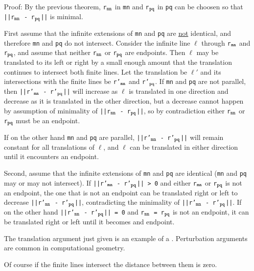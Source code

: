 \documentclass[12pt]{article}
\begin{document}
\begin{indpar}{0.3in}
Proof: By the previous theorem, {\tt r$_{\tt mn}$} in {\tt mn} and
{\tt r$_{\tt pq}$} in {\tt pq} can be choosen so that
{\tt ||r$_{\tt mn}$ - r$_{\tt pq}$||} is minimal.

First assume that the infinite extensions of {\tt mn} and {\tt pq} are
\underline{not} identical, and therefore {\tt mn} and {\tt pq} do not
intersect.  Consider the infinite line $\ell$ through
{\tt r$_{\tt mn}$} and {\tt r$_{\tt pq}$}, and assume that
neither
{\tt r$_{\tt mn}$} or {\tt r$_{\tt pq}$} are endpoints.
Then $\ell$ may be translated to its left or right by
a small enough amount that the translation continues
to intersect both finite lines.  Let the translation
be $\ell'$ and its intersections with the finite lines be
{\tt r'$_{\tt mn}$} and {\tt r'$_{\tt pq}$}.
If {\tt mn} and {\tt pq} are not parallel, then
{\tt ||r'$_{\tt mn}$ - r'$_{\tt pq}$||} will increase
as $\ell$ is translated in one direction and decrease as
it is translated in the other direction, but a decrease
cannot happen by assumption of minimality of
{\tt ||r$_{\tt mn}$ - r$_{\tt pq}$||}, so by contradiction either
{\tt r$_{\tt mn}$} or {\tt r$_{\tt pq}$} must be an endpoint.

If on the other hand {\tt mn} and {\tt pq} are parallel,
{\tt ||r'$_{\tt mn}$ - r'$_{\tt pq}$||} will remain constant
for all translations of $\ell$, and $\ell$ can be translated
in either direction until it encounters an endpoint.

Second, assume that the infinite extensions of {\tt mn} and {\tt pq}
are identical ({\tt mn} and {\tt pq} may or may not intersect).
If {\tt ||r'$_{\tt mn}$ - r'$_{\tt pq}$|| > 0} and
either
{\tt r$_{\tt mn}$} or {\tt r$_{\tt pq}$} is not an endpoint, the one
that is not an endpoint can be translated right or left to decrease
{\tt ||r'$_{\tt mn}$ - r'$_{\tt pq}$||}, contradicting the minimality of
{\tt ||r'$_{\tt mn}$ - r'$_{\tt pq}$||}.  If on the other hand
{\tt ||r'$_{\tt mn}$ - r'$_{\tt pq}$|| = 0} and
{\tt r$_{\tt mn}$ = r$_{\tt pq}$} is not an endpoint, it can be
translated right or left until it becomes and endpoint.
\end{indpar}

The translation argument just given is an example of a
.  Perturbation arguments are common
in computational geometry.

Of course if the finite lines intersect the distance between
them is zero.
\end{document}
